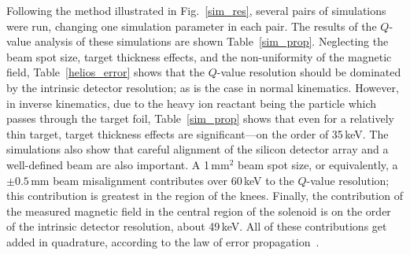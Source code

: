 Following the method illustrated in Fig.~\ref{sim_res}, several pairs of simulations were run, changing one simulation parameter in each pair.  The results of the $Q$-value analysis of these simulations are shown Table~\ref{sim_prop}.  Neglecting the beam spot size, target thickness effects, and the non-uniformity of the magnetic field, Table~\ref{helios_error} shows that the $Q$-value resolution should be dominated by the intrinsic detector resolution; as is the case in normal kinematics.  However, in inverse kinematics, due to the heavy ion reactant being the particle which passes through the target foil, Table~\ref{sim_prop} shows that even for a relatively thin target, target thickness effects are significant---on the order of 35\,keV.  The simulations also show that careful alignment of the silicon detector array and a well-defined beam are also important.  A 1\,mm$^2$ beam spot size, or equivalently, a $\pm0.5$\,mm beam misalignment contributes over 60\,keV to the $Q$-value resolution; this contribution is greatest in the region of the knees.  Finally, the contribution of the measured magnetic field in the central region of the solenoid is on the order of the intrinsic detector resolution, about 49\,keV.  All of these contributions get added in quadrature, according to the law of error propagation~\cite{Bevington_2003,Drosq_2007}.

